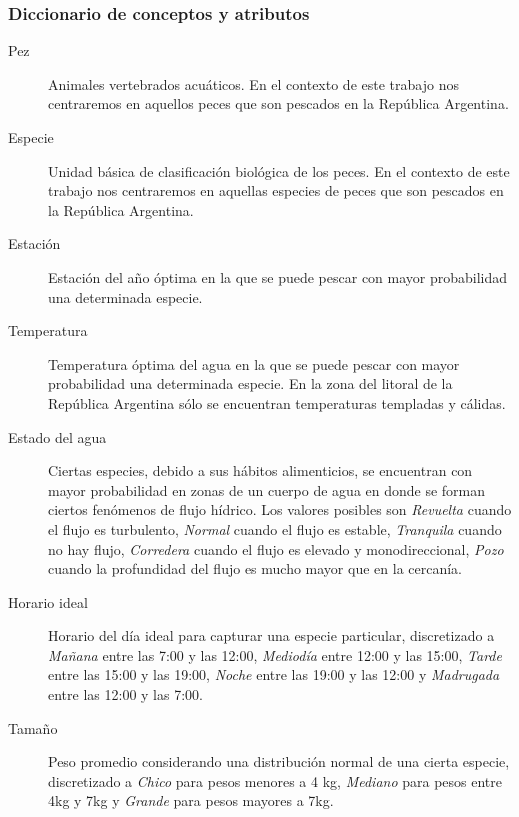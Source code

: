 \documentclass[a4paper,11pt]{article}
\begin{document}
\subsubsection{Diccionario de conceptos y atributos}\label{sec:dca}

\begin{description}

  \item [Pez] Animales vertebrados acuáticos. En el contexto de este trabajo
    nos centraremos en aquellos peces que son pescados en la República
    Argentina.

  \item [Especie] Unidad básica de clasificación biológica de los peces. En el
    contexto de este trabajo nos centraremos en aquellas especies de peces que
    son pescados en la República Argentina.

  \item[Estación] Estación del año óptima en la que se puede pescar con mayor
    probabilidad una determinada especie.

  \item[Temperatura] Temperatura óptima del agua en la que se puede pescar con
    mayor probabilidad una determinada especie. En la zona del litoral de la
    República Argentina sólo se encuentran temperaturas templadas y cálidas.

  \item[Estado del agua] Ciertas especies, debido a sus hábitos alimenticios,
    se encuentran con mayor probabilidad en zonas de un cuerpo de agua en donde
    se forman ciertos fenómenos de flujo hídrico. Los valores posibles son
    \emph{Revuelta} cuando el flujo es turbulento, \emph{Normal} cuando el
    flujo es estable, \emph{Tranquila} cuando no hay flujo, \emph{Corredera}
    cuando el flujo es elevado y monodireccional, \emph{Pozo} cuando la
    profundidad del flujo es mucho mayor que en la cercanía.

  \item[Horario ideal] Horario del día ideal para capturar una especie
    particular, discretizado a \emph{Mañana} entre las 7:00 y las 12:00,
    \emph{Mediodía} entre 12:00 y las 15:00, \emph{Tarde} entre las 15:00 y las
    19:00, \emph{Noche} entre las 19:00 y las 12:00 y \emph{Madrugada} entre
    las 12:00 y las 7:00.

  \item[Tamaño] Peso promedio considerando una distribución normal de una
    cierta especie, discretizado a \emph{Chico} para pesos menores a 4 kg,
    \emph{Mediano} para pesos entre 4kg y 7kg y \emph{Grande} para pesos
    mayores a 7kg.


\end{description}
\end{document}

